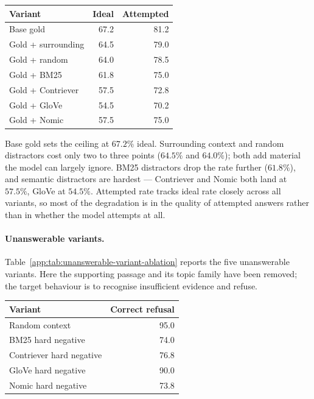\documentclass{article}
\theoremstyle{plain}
\theoremstyle{definition}
\theoremstyle{remark}
\begin{document}
\begin{center}
\begin{minipage}{\columnwidth}
\label{app:tab:answerable-variant-ablation}
\centering
\small
\setlength{\tabcolsep}{4pt}
\begin{tabular}{lrr}
\toprule
\textbf{Variant} & \textbf{Ideal} & \textbf{Attempted} \\
\midrule
Base gold & 67.2 & 81.2 \\
Gold + surrounding & 64.5 & 79.0 \\
Gold + random & 64.0 & 78.5 \\
Gold + BM25 & 61.8 & 75.0 \\
Gold + Contriever & 57.5 & 72.8 \\
Gold + GloVe & 54.5 & 70.2 \\
Gold + Nomic & 57.5 & 75.0 \\
\bottomrule
\end{tabular}
\end{minipage}
\end{center}

Base gold sets the ceiling at $67.2\%$ ideal. Surrounding context and random distractors cost only two to three points ($64.5\%$ and $64.0\%$); both add material the model can largely ignore. BM25 distractors drop the rate further ($61.8\%$), and semantic distractors are hardest --- Contriever and Nomic both land at $57.5\%$, GloVe at $54.5\%$. Attempted rate tracks ideal rate closely across all variants, so most of the degradation is in the quality of attempted answers rather than in whether the model attempts at all.

\paragraph{Unanswerable variants.} Table~\ref{app:tab:unanswerable-variant-ablation} reports the five unanswerable variants. Here the supporting passage and its topic family have been removed; the target behaviour is to recognise insufficient evidence and refuse.

\begin{center}
\begin{minipage}{\columnwidth}
\label{app:tab:unanswerable-variant-ablation}
\centering
\small
\setlength{\tabcolsep}{4pt}
\begin{tabular}{lr}
\toprule
\textbf{Variant} & \textbf{Correct refusal} \\
\midrule
Random context & 95.0 \\
BM25 hard negative & 74.0 \\
Contriever hard negative & 76.8 \\
GloVe hard negative & 90.0 \\
Nomic hard negative & 73.8 \\
\bottomrule
\end{tabular}
\end{minipage}
\end{center}
\end{document}
